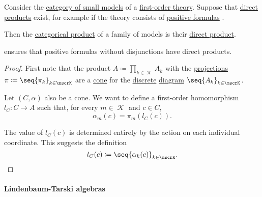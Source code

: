 \begin{proposition}\label{thm:first_order_direct_product_is_categorical_product}
  Consider the \hyperref[def:category_of_small_first_order_models]{category of small models} of a \hyperref[def:first_order_theory]{first-order theory}. Suppose that \hyperref[def:first_order_direct_product]{direct products} exist, for example if the theory consists of \hyperref[def:positive_formula]{positive formulas} .

  Then the \hyperref[def:discrete_category_limits]{categorical product} of a family of models is their \hyperref[def:first_order_direct_product]{direct product}.
\end{proposition}
\begin{comments}
  \item {} ensures that positive formulas without disjunctions have direct products.
\end{comments}
\begin{proof}
  First note that the product \( A \coloneqq \prod_{k \in \mscrK} A_k \) with the \hyperref[thm:direct_product_projections]{projections} \( \pi \coloneqq \seq{ \pi_k }_{k \in \mscrK} \) are a \hyperref[def:category_of_cones/cone]{cone} for the \hyperref[def:discrete_category]{discrete} \hyperref[def:categorical_diagram]{diagram} \( \seq{ A_k }_{k \in \mscrK} \).

  Let \( (C, \alpha) \) also be a cone. We want to define a first-order homomorphism \( l_C: C \to A \) such that, for every \( m \in \mscrK \) and \( c \in C \),
  \begin{equation*}
    \alpha_m(c) = \pi_m(l_C(c)).
  \end{equation*}

  The value of \( l_C(c) \) is determined entirely by the action on each individual coordinate. This suggests the definition
  \begin{equation*}
    l_C(c) \coloneqq \seq{ \alpha_k(c) }_{k \in \mscrK}.
  \end{equation*}
\end{proof}

\paragraph{Lindenbaum-Tarski algebras}

